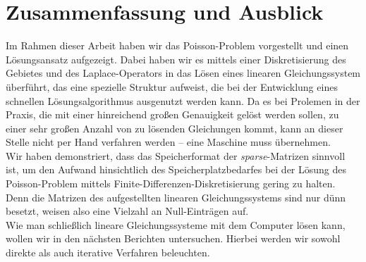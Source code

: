 \documentclass{scrartcl}
\begin{document}
\section{Zusammenfassung und Ausblick}
Im Rahmen dieser Arbeit haben wir das Poisson-Problem vorgestellt und einen Lösungsansatz aufgezeigt.
Dabei haben wir es mittels einer Diskretisierung des Gebietes und des Laplace-Operators in das Lösen eines linearen Gleichungssystem überführt, das eine spezielle Struktur aufweist, die bei der Entwicklung eines schnellen Lösungsalgorithmus ausgenutzt werden kann.
Da es bei Prolemen in der Praxis, die mit einer hinreichend großen Genauigkeit gelöst werden sollen, zu einer sehr großen Anzahl von zu lösenden Gleichungen kommt, kann an dieser Stelle nicht per Hand verfahren werden -- eine Maschine muss übernehmen.\\
Wir haben demonstriert, dass das Speicherformat der \textit{sparse}-Matrizen sinnvoll ist, um den Aufwand hinsichtlich des Speicherplatzbedarfes bei der Lösung des Poisson-Problem mittels Finite-Differenzen-Diskretisierung gering zu halten.
Denn die Matrizen des aufgestellten linearen Gleichungssystems sind nur dünn besetzt, weisen also eine Vielzahl an Null-Einträgen auf.\\
Wie man schließlich lineare Gleichungssysteme mit dem Computer lösen kann, wollen wir in den nächsten Berichten untersuchen.
Hierbei werden wir sowohl direkte als auch iterative Verfahren beleuchten.

\pagebreak
\nocite{*}


\end{document}
